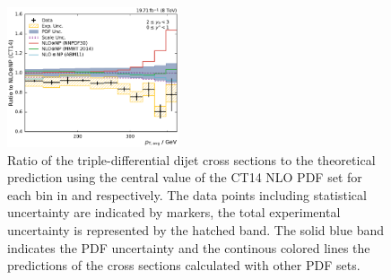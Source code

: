 \begin{figure}[htbp]
    \includegraphics[width=0.45\textwidth]{figures/measurement/ratio_to_CT14nlo+np_totcomp_yb2ys0.pdf}
    \caption[Ratio of the cross section to CT14 NLO]{
    Ratio of the triple-differential dijet cross sections to the theoretical
    prediction using the central value of the CT14 NLO PDF set for each bin in \ystar
    and \yboost respectively. The data points including statistical uncertainty are
    indicated by markers, the total experimental uncertainty is represented by the
    hatched band. The solid blue band indicates the PDF uncertainty and the
    continous colored lines the predictions of the cross sections calculated with
    other PDF sets.}
    \label{fig:ratio_ct14_nlo}
\end{figure}



